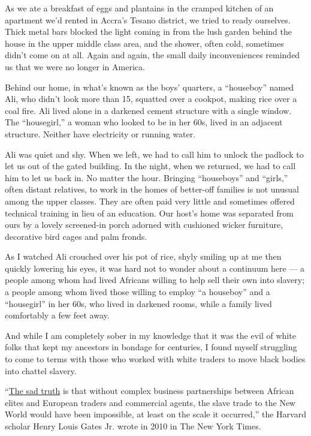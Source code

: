 As we ate a breakfast of eggs and plantains in the cramped kitchen of an
apartment we'd rented in Accra's Tesano district, we tried to ready
ourselves. Thick metal bars blocked the light coming in from the lush
garden behind the house in the upper middle class area, and the shower,
often cold, sometimes didn't come on at all. Again and again, the small
daily inconveniences reminded us that we were no longer in America.

Behind our home, in what's known as the boys' quarters, a ``houseboy''
named Ali, who didn't look more than 15, squatted over a cookpot, making
rice over a coal fire. Ali lived alone in a darkened cement structure
with a single window. The ``housegirl,'' a woman who looked to be in her
60s, lived in an adjacent structure. Neither have electricity or running
water.

Ali was quiet and shy. When we left, we had to call him to unlock the
padlock to let us out of the gated building. In the night, when we
returned, we had to call him to let us back in. No matter the hour.
Bringing ``houseboys'' and ``girls,'' often distant relatives, to work
in the homes of better-off families is not unusual among the upper
classes. They are often paid very little and sometimes offered technical
training in lieu of an education. Our host's home was separated from
ours by a lovely screened-in porch adorned with cushioned wicker
furniture, decorative bird cages and palm fronds.

As I watched Ali crouched over his pot of rice, shyly smiling up at me
then quickly lowering his eyes, it was hard not to wonder about a
continuum here --- a people among whom had lived Africans willing to
help sell their own into slavery; a people among whom lived those
willing to employ ``a houseboy'' and a ``housegirl'' in her 60s, who
lived in darkened rooms, while a family lived comfortably a few feet
away.

And while I am completely sober in my knowledge that it was the evil of
white folks that kept my ancestors in bondage for centuries, I found
myself struggling to come to terms with those who worked with white
traders to move black bodies into chattel slavery.

``\href{https://www.nytimes3xbfgragh.onion/2010/04/23/opinion/23gates.html?searchResultPosition=7}{The
sad truth} is that without complex business partnerships between African
elites and European traders and commercial agents, the slave trade to
the New World would have been impossible, at least on the scale it
occurred,'' the Harvard scholar Henry Louis Gates Jr. wrote in 2010 in
The New York Times.

